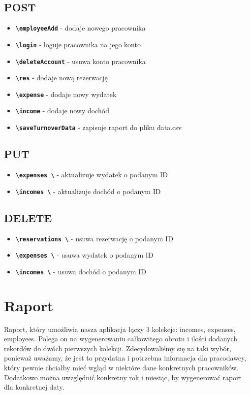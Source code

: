 \documentclass[12pt]{article}
\begin{document}
\subsection{POST}
\begin{itemize}
    \item \textbf{\texttt{\textbackslash employeeAdd}} - dodaje nowego pracownika
    \item \textbf{\texttt{\textbackslash login}} - loguje pracownika na jego konto
    \item \textbf{\texttt{\textbackslash deleteAccount}} - usuwa konto pracownika
    \item \textbf{\texttt{\textbackslash res}} - dodaje nową rezerwację
    \item \textbf{\texttt{\textbackslash expense}} - dodaje nowy wydatek
    \item \textbf{\texttt{\textbackslash income}} - dodaje nowy dochód
    \item \textbf{\texttt{\textbackslash saveTurnoverData}} - zapisuje raport do pliku data.csv
\end{itemize}


\subsection{PUT}
\begin{itemize}
    \item \textbf{\texttt{\textbackslash expenses \textbackslash}} - aktualizuje wydatek o podanym ID
    \item \textbf{\texttt{\textbackslash incomes \textbackslash}} - aktualizuje dochód o podanym ID
\end{itemize}


\subsection{DELETE}
\begin{itemize}
    \item \textbf{\texttt{\textbackslash reservations \textbackslash}} - usuwa rezerwację o podanym ID
    \item \textbf{\texttt{\textbackslash expenses \textbackslash}} - usuwa wydatek o podanym ID
    \item \textbf{\texttt{\textbackslash incomes \textbackslash}} - usuwa dochód o podanym ID
\end{itemize}

\newpage
\section{Raport}
Raport, który umożliwia nasza aplikacja łączy 3 kolekcje: incomes, expenses, employees. Polega on na wygenerowaniu całkowitego obrotu i ilości dodanych rekordów do dwóch pierwszych kolekcji. Zdecydowaliśmy się na taki wybór, ponieważ uważamy, że jest to przydatna i potrzebna informacja dla pracodawcy, który pewnie chciałby mieć wgląd w niektóre dane konkretnych pracowników. Dodatkowo można uwzględnić konkretny rok i miesiąc, by wygenerować raport dla konkretnej daty.
\end{document}
